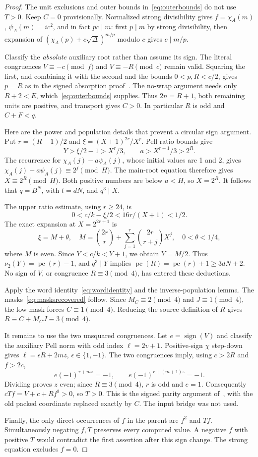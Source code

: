 \documentclass[11pt,a4paper]{article}
\theoremstyle{remark}\newtheorem{remark}[theorem]{Remark}
\newcommand{\pc}{\operatorname{pc}}
\begin{document}
\begin{proof}
The unit exclusions and outer bounds in~\eqref{eq:outerbounds} do not
use \(T>0\). Keep \(C=0\) provisionally. Normalized strong divisibility
gives \(f=\chi_A(m)\), \(\psi_A(m)=ic^2\), and in fact
\(pc\mid m\): first \(p\mid m\) by strong divisibility, then
expansion of \((\chi_A(p)+c\sqrt\Delta)^{m/p}\) modulo \(c\)
gives \(c\mid m/p\).

Classify the \emph{absolute} auxiliary root rather than assume its
sign. The literal congruences \(V\equiv-c\pmod f\) and
\(V\equiv-R\pmod c\) remain valid. Squaring the first, and combining
it with the second and the bounds \(0<p,R<c/2\), gives \(p=R\)
as in the signed absorption proof~\cite{signedabs}. The no-wrap argument
needs only \(R+2<E\), which~\eqref{eq:outerbounds} supplies. Thus
\(2n=R+1\), both remaining units are positive, and transport gives
\(C>0\). In particular \(R\) is odd and \(C+F<q\).

Here are the power and population details that prevent a circular sign
argument. Put \(r=(R-1)/2\) and
\(\xi=(X+1)^{2r}/X^r\). Pell ratio bounds give
\[
 Y>\xi/2-1>X^r/3,\qquad a>X^{r+1}/3>2^R.
\]
The recurrence for \(\chi_A(j)-a\psi_A(j)\), whose initial values
are 1 and 2, gives \(\chi_A(j)-a\psi_A(j)\equiv2^j\pmod H\).
The main-root equation therefore gives \(X\equiv2^R\pmod H\).
Both positive numbers are below \(a<H\), so \(X=2^R\).
It follows that \(q=B^N\), with \(t=dN\), and \(q^3\mid X\).

The upper ratio estimate, using \(r\ge24\), is
\[
 0<c/k-\xi/2<16r/(X+1)<1/2.
\]
The exact expansion at \(X=2^{2r+1}\) is
\[
 \xi=M+\theta,\quad
 M=\binom{2r}{r}+\sum_{j=1}^r\binom{2r}{r+j}X^j,
 \quad0<\theta<1/4,
\]
where \(M\) is even. Since \(Y<c/k<Y+1\), we obtain \(Y=M/2\).
Thus \(\nu_2(Y)=\pc(r)-1\), and \(q^3\mid Y\) implies
\(\pc(R)=\pc(r)+1\ge3dN+2\). No sign of \(V\), or congruence
\(R\equiv3\pmod4\), has entered these deductions.

Apply the word identity~\eqref{eq:wordidentity} and the
inverse-population lemma. The masks~\eqref{eq:masksrecovered} follow.
Since \(M_C\equiv2\pmod4\) and \(J\equiv1\pmod4\), the low
mask forces \(C\equiv1\pmod4\). Reducing the source definition of
\(R\) gives \(R\equiv C+M_CJ\equiv3\pmod4\).

It remains to use the two unsquared congruences. Let
\(e=\operatorname{sign}(V)\) and classify the auxiliary Pell norm with
odd index \(\ell=2v+1\). Positive-sign \(\chi\) step-down gives
\(\ell=\epsilon R+2mz\), \(\epsilon\in\{1,-1\}\).
The two congruences imply, using \(c>2R\) and \(f>2c\),
\[
 e(-1)^{r+mz}=-1,\qquad e(-1)^{r+(m+1)z}=-1.
\]
Dividing proves \(z\) even; since \(R\equiv3\pmod4\), \(r\)
is odd and \(e=1\). Consequently
\(cTf=V+c+Rf^2>0\), so \(T>0\). This is the signed parity argument
of~\cite{signedsound}, with the old packed coordinate replaced exactly
by \(C\). The input bridge was not used.

Finally, the only direct occurrences of \(f\) in the parent are
\(f^2\) and \(Tf\). Simultaneously negating \(f,T\) preserves every
computed value. A negative \(f\) with positive \(T\) would contradict
the first assertion after this sign change. The strong equation excludes
\(f=0\).
\end{proof}
\end{document}
